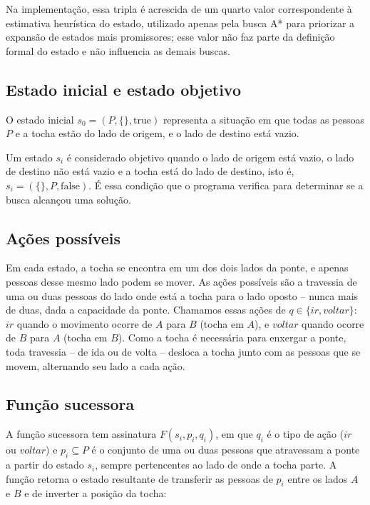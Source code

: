 \documentclass[12pt,a4paper]{article}
\begin{document}
Na implementação, essa tripla é acrescida de um quarto valor correspondente à
estimativa heurística do estado, utilizado apenas pela busca A* para
priorizar a expansão de estados mais promissores; esse valor não faz parte da
definição formal do estado e não influencia as demais buscas.

\subsection{Estado inicial e estado objetivo}

O estado inicial $s_0 = (P, \{\}, \text{true})$ representa a situação em que
todas as pessoas $P$ e a tocha estão do lado de origem, e o lado de destino
está vazio.

Um estado $s_i$ é considerado objetivo quando o lado de origem está vazio, o
lado de destino não está vazio e a tocha está do lado de destino, isto é,
$s_i = (\{\}, P, \text{false})$. É essa condição que o programa verifica para
determinar se a busca alcançou uma solução.

\subsection{Ações possíveis}

Em cada estado, a tocha se encontra em um dos dois lados da ponte, e apenas
pessoas desse mesmo lado podem se mover. As ações possíveis são a travessia de
uma ou duas pessoas do lado onde está a tocha para o lado oposto -- nunca mais
de duas, dada a capacidade da ponte. Chamamos essas ações de
$q \in \{\mathit{ir}, \mathit{voltar}\}$: $\mathit{ir}$ quando o movimento
ocorre de $A$ para $B$ (tocha em $A$), e $\mathit{voltar}$ quando ocorre de
$B$ para $A$ (tocha em $B$). Como a tocha é necessária para enxergar a ponte,
toda travessia -- de ida ou de volta -- desloca a tocha junto com as pessoas
que se movem, alternando seu lado a cada ação.

\subsection{Função sucessora}

A função sucessora tem assinatura $F(s_i, p_i, q_i)$, em que $q_i$ é o tipo de
ação ($\mathit{ir}$ ou $\mathit{voltar}$) e $p_i \subseteq P$ é o conjunto de
uma ou duas pessoas que atravessam a ponte a partir do estado $s_i$, sempre
pertencentes ao lado de onde a tocha parte. A função retorna o estado
resultante de transferir as pessoas de $p_i$ entre os lados $A$ e $B$ e de
inverter a posição da tocha:
\end{document}
